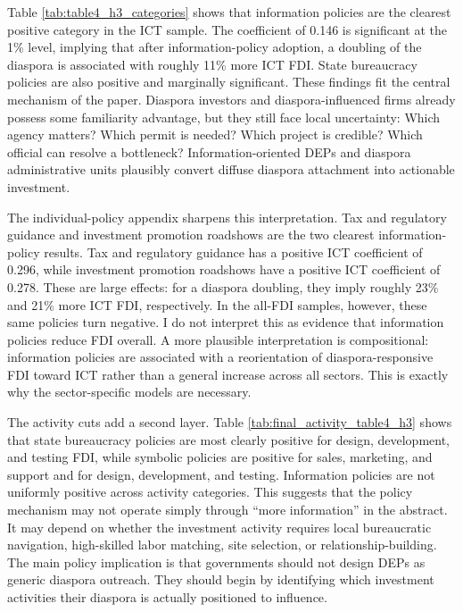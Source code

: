 \documentclass[doublespace,nopageskip]{UVAthesis}
\begin{document}
Table \ref{tab:table4_h3_categories} shows that information policies are the clearest positive category in the ICT sample. The coefficient of 0.146 is significant at the 1\% level, implying that after information-policy adoption, a doubling of the diaspora is associated with roughly 11\% more ICT FDI. State bureaucracy policies are also positive and marginally significant. These findings fit the central mechanism of the paper. Diaspora investors and diaspora-influenced firms already possess some familiarity advantage, but they still face local uncertainty: Which agency matters? Which permit is needed? Which project is credible? Which official can resolve a bottleneck? Information-oriented DEPs and diaspora administrative units plausibly convert diffuse diaspora attachment into actionable investment.

The individual-policy appendix sharpens this interpretation. Tax and regulatory guidance and investment promotion roadshows are the two clearest information-policy results. Tax and regulatory guidance has a positive ICT coefficient of 0.296, while investment promotion roadshows have a positive ICT coefficient of 0.278. These are large effects: for a diaspora doubling, they imply roughly 23\% and 21\% more ICT FDI, respectively. In the all-FDI samples, however, these same policies turn negative. I do not interpret this as evidence that information policies reduce FDI overall. A more plausible interpretation is compositional: information policies are associated with a reorientation of diaspora-responsive FDI toward ICT rather than a general increase across all sectors. This is exactly why the sector-specific models are necessary.

The activity cuts add a second layer. Table \ref{tab:final_activity_table4_h3} shows that state bureaucracy policies are most clearly positive for design, development, and testing FDI, while symbolic policies are positive for sales, marketing, and support and for design, development, and testing. Information policies are not uniformly positive across activity categories. This suggests that the policy mechanism may not operate simply through ``more information'' in the abstract. It may depend on whether the investment activity requires local bureaucratic navigation, high-skilled labor matching, site selection, or relationship-building. The main policy implication is that governments should not design DEPs as generic diaspora outreach. They should begin by identifying which investment activities their diaspora is actually positioned to influence.
\end{document}

